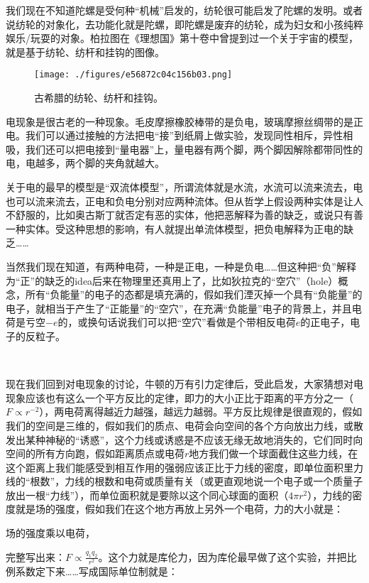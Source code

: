我们现在不知道陀螺是受何种“机械”启发的，纺轮很可能启发了陀螺的发明。或者说纺轮的对象化，去功能化就是陀螺，即陀螺是废弃的纺轮，成为妇女和小孩纯粹娱乐/玩耍的对象。柏拉图在《理想国》第十卷中曾提到过一个关于宇宙的模型，就是基于纺轮、纺杆和挂钩的图像。

\begin{figure}[ht]
\centering
\texttt{[image: ./figures/e56872c04c156b03.png]}
\caption{古希腊的纺轮、纺杆和挂钩。} \label{fig_QMPre2_9}
\end{figure}

电现象是很古老的一种现象。毛皮摩擦橡胶棒带的是负电，玻璃摩擦丝绸带的是正电。我们可以通过接触的方法把电“接”到纸屑上做实验，发现同性相斥，异性相吸，我们还可以把电接到“量电器”上，量电器有两个脚，两个脚因解除都带同性的电，电越多，两个脚的夹角就越大。

关于电的最早的模型是“双流体模型”，所谓流体就是水流，水流可以流来流去，电也可以流来流去，正电和负电分别对应两种流体。但从哲学上假设两种实体是让人不舒服的，比如奥古斯丁就否定有恶的实体，他把恶解释为善的缺乏，或说只有善一种实体。受这种思想的影响，有人就提出单流体模型，把负电解释为正电的缺乏……

当然我们现在知道，有两种电荷，一种是正电，一种是负电……但这种把“负”解释为“正”的缺乏的idea后来在物理里还真用上了，比如狄拉克的“空穴”（hole）概念，所有“负能量”的电子的态都是填充满的，假如我们湮灭掉一个具有“负能量”的电子，就相当于产生了“正能量”的“空穴”，在充满“负能量”电子的背景上，并且电荷是亏空$-e$的，或换句话说我们可以把“空穴”看做是个带相反电荷$e$的正电子，电子的反粒子。

~

现在我们回到对电现象的讨论，牛顿的万有引力定律后，受此启发，大家猜想对电现象应该也有这么一个平方反比的定律，即力的大小正比于距离的平方分之一（$F \propto r^{-2}$），两电荷离得越近力越强，越远力越弱。平方反比规律是很直观的，假如我们的空间是三维的，假如我们的质点、电荷会向空间的各个方向放出力线，或散发出某种神秘的“诱惑”，这个力线或诱惑是不应该无缘无故地消失的，它们同时向空间的所有方向跑，假如距离质点或电荷$r$地方我们做一个球面截住这些力线，在这个距离上我们能感受到相互作用的强弱应该正比于力线的密度，即单位面积里力线的“根数”，力线的根数和电荷或质量有关（或更直观地说一个电子或一个质量子放出一根“力线”），而单位面积就是要除以这个同心球面的面积（$4 \pi r^2$），力线的密度就是场的强度，假如我们在这个地方再放上另外一个电荷，力的大小就是：

场的强度乘以电荷，

完整写出来：$F \propto \frac{q_1 q_2}{r^2}$。这个力就是库伦力，因为库伦最早做了这个实验，并把比例系数定下来……写成国际单位制就是：

